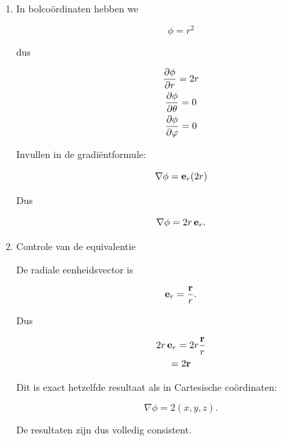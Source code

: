 \documentclass[11pt,a4paper]{article}
\begin{document}
\begin{enumerate}
        \[
            \pdv{\phi}{x} = 2x, \quad
            \pdv{\phi}{y} = 2y, \quad
            \pdv{\phi}{z} = 2z
        \]

        Dus

        \[
            \nabla\phi = (2x,2y,2z)
        \]

        Of in vectorvorm

        \[
            \nabla\phi = 2(x,y,z) = 2\vb{r}.
        \]

        \item In bolcoördinaten hebben we

        \[
            \phi = r^2
        \]

        dus

        \begin{gather*}
            \pdv{\phi}{r} = 2r\\
            \pdv{\phi}{\theta} = 0\\
            \pdv{\phi}{\varphi} = 0\\
        \end{gather*}

        Invullen in de gradiëntformule:

        \[
            \nabla\phi =
            \vb{e}_r (2r)
        \]

        Dus

        \[
            \nabla\phi = 2r\,\vb{e}_r.
        \]

        \item Controle van de equivalentie

        De radiale eenheidsvector is

        \[
            \vb{e}_r = \frac{\vb{r}}{r}.
        \]

        Dus

        \begin{gather*}
            2r\,\vb{e}_r =
            2r \frac{\vb{r}}{r}\\
            = 2\vb{r}\\
        \end{gather*}

        Dit is exact hetzelfde resultaat als in Cartesische coördinaten:

        \[
            \nabla\phi = 2(x,y,z).
        \]

        De resultaten zijn dus volledig consistent.

    \end{enumerate}
\end{document}
